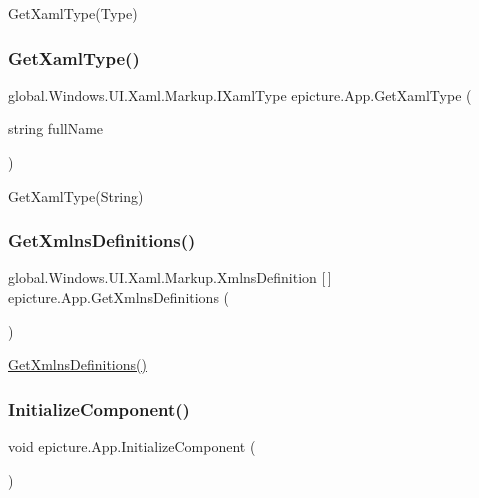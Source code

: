 Get\+Xaml\+Type(\+Type) 

\mbox{\label{classepicture_1_1_app_a5d41e2aede9485b8010a8c707be7d434}} 
\subsubsection{\texorpdfstring{Get\+Xaml\+Type()}{GetXamlType()}\hspace{0.1cm}{\footnotesize\ttfamily [2/2]}}
{\footnotesize\ttfamily global.\+Windows.\+U\+I.\+Xaml.\+Markup.\+I\+Xaml\+Type epicture.\+App.\+Get\+Xaml\+Type (\begin{DoxyParamCaption}\item[{string}]{full\+Name }\end{DoxyParamCaption})}



Get\+Xaml\+Type(\+String) 

\mbox{\label{classepicture_1_1_app_a2e22f01b876b3511e2dbc9241ab1a2cc}} 
\subsubsection{\texorpdfstring{Get\+Xmlns\+Definitions()}{GetXmlnsDefinitions()}}
{\footnotesize\ttfamily global.\+Windows.\+U\+I.\+Xaml.\+Markup.\+Xmlns\+Definition \mbox{[}$\,$\mbox{]} epicture.\+App.\+Get\+Xmlns\+Definitions (\begin{DoxyParamCaption}{ }\end{DoxyParamCaption})}



\mbox{\hyperlink{classepicture_1_1_app_a2e22f01b876b3511e2dbc9241ab1a2cc}{Get\+Xmlns\+Definitions()}} 

\mbox{\label{classepicture_1_1_app_ab502a2fb60a201127ee980272694fa2c}} 
\subsubsection{\texorpdfstring{Initialize\+Component()}{InitializeComponent()}}
{\footnotesize\ttfamily void epicture.\+App.\+Initialize\+Component (\begin{DoxyParamCaption}{ }\end{DoxyParamCaption})}



